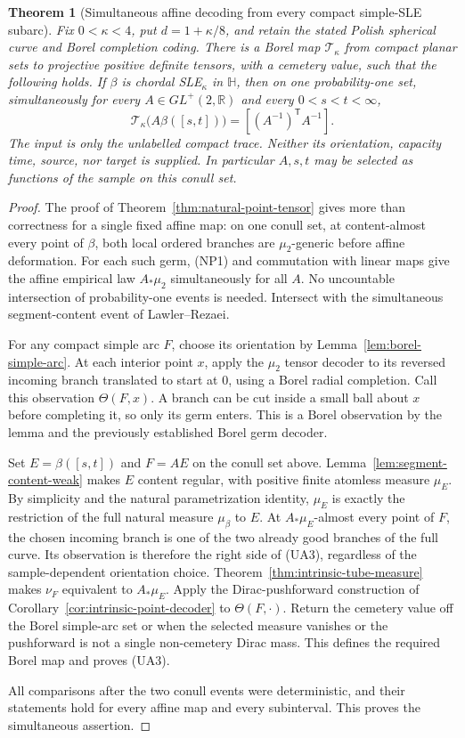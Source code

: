 \documentclass[11pt]{article}
\newtheorem{theorem}{Theorem}[section]
\theoremstyle{definition}\newtheorem{definition}[theorem]{Definition}
\theoremstyle{remark}\newtheorem{remark}[theorem]{Remark}
\begin{document}
\begin{theorem}[Simultaneous affine decoding from every compact simple-SLE subarc]
\label{thm:unlabelled-simple-arc}
Fix $0<\kappa<4$, put $d=1+\kappa/8$, and retain the stated
Polish spherical curve and Borel completion coding.
There is a Borel map $\mathcal T_\kappa$ from compact planar sets
to projective positive definite tensors, with a cemetery value,
such that the following holds. If $\beta$ is chordal SLE$_\kappa$
in $\mathbb H$, then on one probability-one set, simultaneously
for every $A\in GL^+(2,\mathbb R)$ and every $0<s<t<\infty$,
\[
 \mathcal T_\kappa\bigl(A\beta([s,t])\bigr)
        =[(A^{-1})^{\mathsf T}A^{-1}].
 \tag{UA3}
\]
The input is only the unlabelled compact trace. Neither its
orientation, capacity time, source, nor target is supplied.
In particular $A,s,t$ may be selected as functions of the sample
on this conull set.
\end{theorem}
\begin{proof}
The proof of Theorem~\ref{thm:natural-point-tensor} gives more
than correctness for a single fixed affine map: on one conull
set, at content-almost every point of $\beta$, both local
ordered branches are $\mu_2$-generic before affine deformation.
For each such germ, (NP1) and commutation with linear maps
give the affine empirical law $A_*\mu_2$ simultaneously for
all $A$. No uncountable intersection of probability-one events
is needed. Intersect with the simultaneous segment-content
event of Lawler--Rezaei.

For any compact simple arc $F$, choose its orientation by
Lemma~\ref{lem:borel-simple-arc}. At each interior point $x$,
apply the $\mu_2$ tensor decoder to its reversed incoming branch
translated to start at $0$, using a Borel radial completion.
Call this observation $\Theta(F,x)$. A branch can be cut inside
a small ball about $x$ before completing it, so only its germ
enters. This is a Borel observation by the lemma and the
previously established Borel germ decoder.

Set $E=\beta([s,t])$ and $F=AE$ on the conull set above.
Lemma~\ref{lem:segment-content-weak} makes $E$ content regular,
with positive finite atomless measure $\mu_E$. By simplicity and
the natural parametrization identity, $\mu_E$ is exactly the
restriction of the full natural measure $\mu_\beta$ to $E$.
At $A_*\mu_E$-almost every point of $F$, the chosen incoming
branch is one of the two already good branches of the full
curve. Its observation is therefore the right side of (UA3),
regardless of the sample-dependent orientation choice.
Theorem~\ref{thm:intrinsic-tube-measure} makes $\nu_F$ equivalent
to $A_*\mu_E$. Apply the Dirac-pushforward construction of
Corollary~\ref{cor:intrinsic-point-decoder} to $\Theta(F,\cdot)$.
Return the cemetery value off the Borel simple-arc set or when
the selected measure vanishes or the pushforward is not a
single non-cemetery Dirac mass. This defines the required
Borel map and proves (UA3).

All comparisons after the two conull events were deterministic,
and their statements hold for every affine map and every
subinterval. This proves the simultaneous assertion.
\end{proof}
\end{document}
